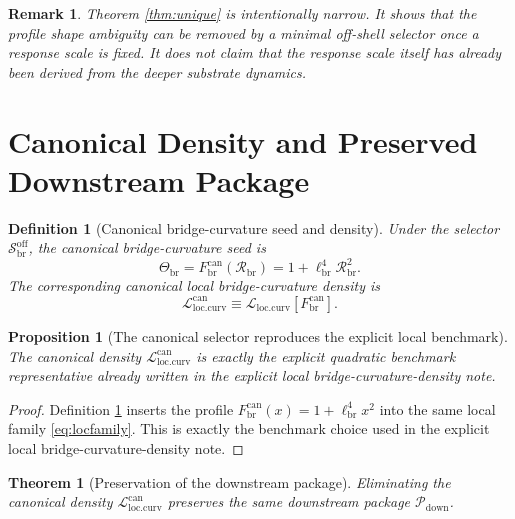 \documentclass[11pt]{article}
\newcommand{\CurvSeed}{\Theta_{\mathrm{br}}}
\newcommand{\CurvScale}{\ell_{\mathrm{br}}}
\newcommand{\CurvProfileCan}{F_{\mathrm{br}}^{\mathrm{can}}}
\newcommand{\BridgeCurv}{\mathcal R_{\mathrm{br}}}
\newcommand{\DownPkg}{\mathscr P_{\mathrm{down}}}
\newcommand{\ProfRule}{\mathscr S_{\mathrm{br}}^{\mathrm{off}}}
\newtheorem{definition}{Definition}
\newtheorem{proposition}{Proposition}
\newtheorem{remark}{Remark}
\newtheorem{theorem}{Theorem}
\begin{document}
\begin{remark}
Theorem \ref{thm:unique} is intentionally narrow. It shows that the profile shape ambiguity can be removed by a minimal off-shell selector once a response scale is fixed. It does not claim that the response scale itself has already been derived from the deeper substrate dynamics.
\end{remark}

\section{Canonical Density and Preserved Downstream Package}

\begin{definition}[Canonical bridge-curvature seed and density]
\label{def:canonicaldensity}
Under the selector \(\ProfRule\), the canonical bridge-curvature seed is
\begin{equation}
\CurvSeed
=
\CurvProfileCan(\BridgeCurv)
=
1+\CurvScale^4\BridgeCurv^2.
\label{eq:canonicalseed}
\end{equation}
The corresponding canonical local bridge-curvature density is
\begin{equation}
\mathcal L_{\mathrm{loc.curv}}^{\mathrm{can}}
\equiv
\mathcal L_{\mathrm{loc.curv}}[\CurvProfileCan].
\label{eq:canonicaldensity}
\end{equation}
\end{definition}

\begin{proposition}[The canonical selector reproduces the explicit local benchmark]
\label{prop:reproduce}
The canonical density \(\mathcal L_{\mathrm{loc.curv}}^{\mathrm{can}}\) is exactly the explicit quadratic benchmark representative already written in the explicit local bridge-curvature-density note.
\end{proposition}

\begin{proof}
Definition \ref{def:canonicaldensity} inserts the profile \(\CurvProfileCan(x)=1+\CurvScale^4x^2\) into the same local family \eqref{eq:locfamily}. This is exactly the benchmark choice used in the explicit local bridge-curvature-density note.
\end{proof}

\begin{theorem}[Preservation of the downstream package]
\label{thm:preserve}
Eliminating the canonical density \(\mathcal L_{\mathrm{loc.curv}}^{\mathrm{can}}\) preserves the same downstream package \(\DownPkg\).
\end{theorem}
\end{document}
